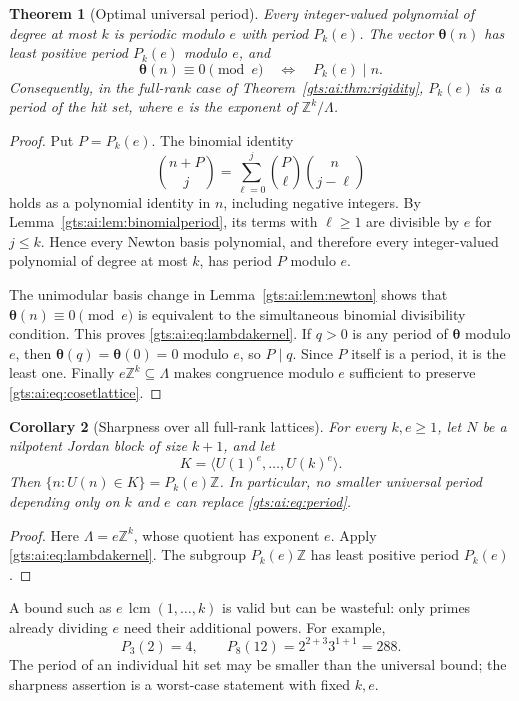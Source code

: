 \documentclass[11pt,letterpaper]{article}
\newtheorem{theorem}{Theorem}[section]
\newtheorem{corollary}[theorem]{Corollary}
\theoremstyle{definition}
\theoremstyle{remark}
\newcommand{\Z}{\mathbb Z}
\newcommand{\vv}{\boldsymbol\theta}
\newcommand{\lcm}{\operatorname{lcm}}
\begin{document}
\begin{theorem}[Optimal universal period]\label{gts:ai:thm:period}
Every integer-valued polynomial of degree at most $k$ is periodic modulo $e$ with period $P_k(e)$. The vector $\vv(n)$ has least positive period $P_k(e)$ modulo $e$, and
\begin{equation}\label{gts:ai:eq:lambdakernel}
 \vv(n)\equiv0\pmod e\quad\Longleftrightarrow\quad P_k(e)\mid n.
\end{equation}
Consequently, in the full-rank case of Theorem~\ref{gts:ai:thm:rigidity}, $P_k(e)$ is a period of the hit set, where $e$ is the exponent of $\Z^k/\Lambda$.
\end{theorem}
\begin{proof}
Put $P=P_k(e)$. The binomial identity
\[
 \binom{n+P}{j}=\sum_{\ell=0}^j\binom P\ell\binom n{j-\ell}
\]
holds as a polynomial identity in $n$, including negative integers. By Lemma~\ref{gts:ai:lem:binomialperiod}, its terms with $\ell\ge1$ are divisible by $e$ for $j\le k$. Hence every Newton basis polynomial, and therefore every integer-valued polynomial of degree at most $k$, has period $P$ modulo $e$.

The unimodular basis change in Lemma~\ref{gts:ai:lem:newton} shows that $\vv(n)\equiv0\pmod e$ is equivalent to the simultaneous binomial divisibility condition. This proves \eqref{gts:ai:eq:lambdakernel}. If $q>0$ is any period of $\vv$ modulo $e$, then $\vv(q)=\vv(0)=0$ modulo $e$, so $P\mid q$. Since $P$ itself is a period, it is the least one. Finally $e\Z^k\subseteq\Lambda$ makes congruence modulo $e$ sufficient to preserve \eqref{gts:ai:eq:cosetlattice}.
\end{proof}
\begin{corollary}[Sharpness over all full-rank lattices]\label{gts:ai:cor:periodsharp}
For every $k,e\ge1$, let $N$ be a nilpotent Jordan block of size $k+1$, and let
\[
 K=\langle U(1)^e,\ldots,U(k)^e\rangle.
\]
Then $\{n:U(n)\in K\}=P_k(e)\Z$. In particular, no smaller universal period depending only on $k$ and $e$ can replace \eqref{gts:ai:eq:period}.
\end{corollary}
\begin{proof}
Here $\Lambda=e\Z^k$, whose quotient has exponent $e$. Apply \eqref{gts:ai:eq:lambdakernel}. The subgroup $P_k(e)\Z$ has least positive period $P_k(e)$.
\end{proof}
A bound such as $e\,\lcm(1,\ldots,k)$ is valid but can be wasteful: only primes already dividing $e$ need their additional powers. For example,
\[
 P_3(2)=4,\qquad P_8(12)=2^{2+3}3^{1+1}=288.
\]
The period of an individual hit set may be smaller than the universal bound; the sharpness assertion is a worst-case statement with fixed $k,e$.
\end{document}
